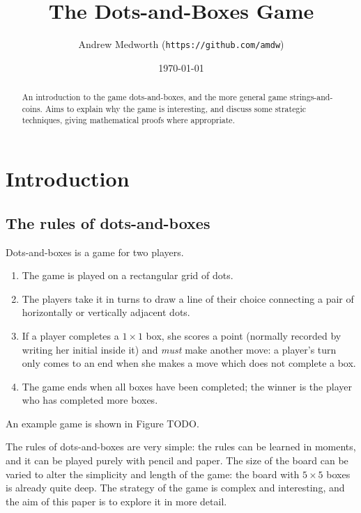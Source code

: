 \documentclass[a4paper,twocolumn]{article}
\begin{document}
\title{The Dots-and-Boxes Game}
\author{Andrew Medworth (\texttt{https://github.com/amdw})}
\date{\today}
\maketitle

\begin{abstract}
  An introduction to the game dots-and-boxes, and the more general game
  strings-and-coins. Aims to explain why the game is interesting, and discuss
  some strategic techniques, giving mathematical proofs where appropriate.
\end{abstract}

\tableofcontents

\section{Introduction}

\subsection{The rules of dots-and-boxes}

Dots-and-boxes is a game for two players.

\begin{enumerate}
  \item The game is played on a rectangular grid of dots.
  \item The players take it in turns to draw a line of their choice
    connecting a pair of horizontally or vertically adjacent dots.
  \item If a player completes a $1 \times 1$ box, she scores a point
    (normally recorded by writing her initial inside it) and
    \emph{must} make another move: a player's turn only comes to an
    end when she makes a move which does not complete a box.
  \item The game ends when all boxes have been completed; the winner
    is the player who has completed more boxes.
\end{enumerate}

An example game is shown in Figure TODO.

The rules of dots-and-boxes are very simple: the rules can be learned
in moments, and it can be played purely with pencil and paper. The
size of the board can be varied to alter the simplicity and length of
the game: the board with $5 \times 5$ boxes is already quite deep. The
strategy of the game is complex and interesting, and the aim of this
paper is to explore it in more detail.
\end{document}
